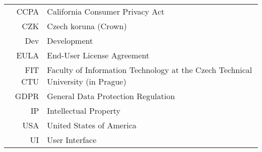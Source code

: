\documentclass[english,bachelor,oneside]{ctufit-thesis} %
\begin{document}
\chapter{\thectufitabbreviationlabel}
	
\begin{tabular}{rl}
CCPA    & California Consumer Privacy Act\\
CZK     & Czech koruna (Crown)\\
Dev     & Development\\
EULA    & End-User License Agreement\\
FIT CTU & Faculty of Information Technology at the Czech Technical University (in Prague)\\
GDPR    & General Data Protection Regulation\\
IP      & Intellectual Property\\
USA     & United States of America\\
UI      & User Interface\\
\end{tabular}
\resumeTOCentries
\mainmatter\mainmatterinit %


%
\clearpage %
\setcounter{page}{1}
%





%
\setcounter{page}{1} %

%
\appendix\appendixinit %
%

\backmatter %

\printbibliography %

\end{document}
